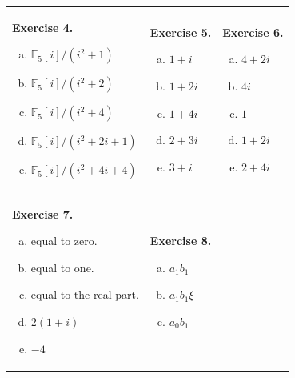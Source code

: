 \documentclass[../lecture-notes-148x210.tex]{subfiles}
\begin{document}
\begin{center}
    \begin{tabular}{p{4.5cm}p{3cm}p{4cm}}
        \textbf{Exercise 4.}
        \begin{enumerate}[a)]
            \item $\mathbb{F}_5[i]/(i^2+1)$
            \item $\mathbb{F}_5[i]/(i^2+2)$
            \item $\mathbb{F}_5[i]/(i^2+4)$
            \item $\mathbb{F}_5[i]/(i^2+2i+1)$
            \item $\mathbb{F}_5[i]/(i^2+4i+4)$
        \end{enumerate} &   
        \textbf{Exercise 5.}
        \begin{enumerate}[a)]
            \item $1+i$
            \item $1+2i$
            \item $1+4i$
            \item $2+3i$
            \item $3+i$
        \end{enumerate} &
        \textbf{Exercise 6.}
        \begin{enumerate}[a)]
            \item $4+2i$
            \item $4i$
            \item $1$
            \item $1+2i$
            \item $2+4i$
        \end{enumerate}
        \\
        \textbf{Exercise 7.}
        \begin{enumerate}[a)]
            \item equal to zero.
            \item equal to one.
            \item equal to the real part.
            \item $2(1+i)$
            \item $-4$
        \end{enumerate} & 
        \textbf{Exercise 8.}
        \begin{enumerate}[a)]
            \item $a_1b_1$
            \item $a_1b_1\xi$
            \item $a_0b_1$

\end{enumerate}
\end{tabular}
\end{center}
\end{document}
